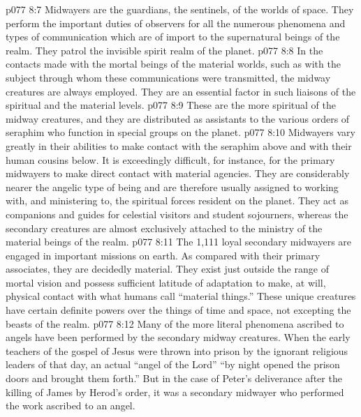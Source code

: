 \pc \vs p077 8:7 \bibnobreakspace {} Midwayers are the guardians, the sentinels, of the worlds of space. They perform the important duties of observers for all the numerous phenomena and types of communication which are of import to the supernatural beings of the realm. They patrol the invisible spirit realm of the planet.
\pc \vs p077 8:8 \bibnobreakspace {} In the contacts made with the mortal beings of the material worlds, such as with the subject through whom these communications were transmitted, the midway creatures are always employed. They are an essential factor in such liaisons of the spiritual and the material levels.
\pc \vs p077 8:9 \bibnobreakspace {} These are the more spiritual of the midway creatures, and they are distributed as assistants to the various orders of seraphim who function in special groups on the planet.
\pc \vs p077 8:10 Midwayers vary greatly in their abilities to make contact with the seraphim above and with their human cousins below. It is exceedingly difficult, for instance, for the primary midwayers to make direct contact with material agencies. They are considerably nearer the angelic type of being and are therefore usually assigned to working with, and ministering to, the spiritual forces resident on the planet. They act as companions and guides for celestial visitors and student sojourners, whereas the secondary creatures are almost exclusively attached to the ministry of the material beings of the realm.
\vs p077 8:11 The 1,111 loyal secondary midwayers are engaged in important missions on earth. As compared with their primary associates, they are decidedly material. They exist just outside the range of mortal vision and possess sufficient latitude of adaptation to make, at will, physical contact with what humans call “material things.” These unique creatures have certain definite powers over the things of time and space, not excepting the beasts of the realm.
\vs p077 8:12 Many of the more literal phenomena ascribed to angels have been performed by the secondary midway creatures. When the early teachers of the gospel of Jesus were thrown into prison by the ignorant religious leaders of that day, an actual “angel of the Lord” “by night opened the prison doors and brought them forth.” But in the case of Peter’s deliverance after the killing of James by Herod’s order, it was a secondary midwayer who performed the work ascribed to an angel.
